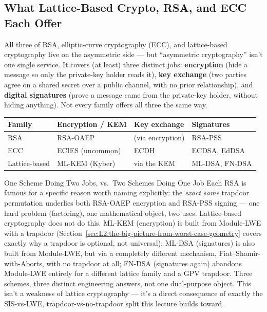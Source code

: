 \subsection{What Lattice-Based Crypto, RSA, and ECC Each Offer}
\label{sec:L2:what-lattice-rsa-ecc-each-offer}

All three of RSA, elliptic-curve cryptography (ECC), and lattice-based cryptography live on the asymmetric side --- but ``asymmetric cryptography'' isn't one single service. It covers (at least) three distinct jobs: \textbf{encryption} (hide a message so only the private-key holder reads it), \textbf{key exchange} (two parties agree on a shared secret over a public channel, with no prior relationship), and \textbf{digital signatures} (prove a message came from the private-key holder, without hiding anything). Not every family offers all three the same way.

\begin{center}
\renewcommand{\arraystretch}{1.3}
\begin{tabular}{|l|l|l|l|}
\hline
\textbf{Family} & \textbf{Encryption / KEM} & \textbf{Key exchange} & \textbf{Signatures} \\
\hline
RSA & RSA-OAEP & (via encryption) & RSA-PSS \\
ECC & ECIES (uncommon) & ECDH & ECDSA, EdDSA \\
Lattice-based & ML-KEM (Kyber) & via the KEM & ML-DSA, FN-DSA \\
\hline
\end{tabular}
\end{center}

\begin{rmkbox}{One Scheme Doing Two Jobs, vs.\ Two Schemes Doing One Job Each}
RSA is famous for a specific reason worth naming explicitly: the \emph{exact same} trapdoor permutation underlies both RSA-OAEP encryption and RSA-PSS signing --- one hard problem (factoring), one mathematical object, two uses. Lattice-based cryptography does not do this. ML-KEM (encryption) is built from Module-LWE with a trapdoor (Section~\ref{sec:L2:the-big-picture-from-worst-case-geometry} covers exactly why a trapdoor is optional, not universal); ML-DSA (signatures) is also built from Module-LWE, but via a completely different mechanism, Fiat--Shamir-with-Aborts, with no trapdoor at all; FN-DSA (signatures again) abandons Module-LWE entirely for a different lattice family and a GPV trapdoor. Three schemes, three distinct engineering answers, not one dual-purpose object. This isn't a weakness of lattice cryptography --- it's a direct consequence of exactly the SIS-vs-LWE, trapdoor-vs-no-trapdoor split this lecture builds toward.
\end{rmkbox}

